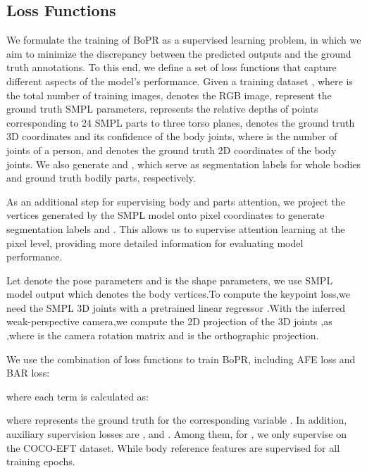 \documentclass[10pt,twocolumn,letterpaper]{article}
\begin{document}
\subsection{Loss Functions}
We formulate the training of BoPR as a supervised learning problem, in which we aim to minimize the discrepancy between the predicted outputs and the ground truth annotations. To this end, we define a set of loss functions that capture different aspects of the model's performance. Given a training dataset , where  is the total number of training images,  denotes the RGB image,  represent the ground truth SMPL parameters,  represents the relative depths of points corresponding to 24 SMPL parts to three torso planes,  denotes the ground truth 3D coordinates and its confidence of the body joints, where  is the number of joints of a person, and  denotes the ground truth 2D coordinates of the body joints. We also generate  and , which serve as segmentation labels for whole bodies and ground truth bodily parts, respectively.

As an additional step for supervising body and parts attention, we project the vertices generated by the SMPL model onto pixel coordinates to generate segmentation labels  and . This allows us to supervise attention learning at the pixel level, providing more detailed information for evaluating model performance.

Let  denote the pose parameters and  is the shape parameters, we use SMPL model output  which denotes the body vertices.To compute the keypoint loss,we need the SMPL 3D joints  with a pretrained linear regressor .With the inferred weak-perspective camera,we compute the 2D projection of the 3D joints ,as ,where  is the camera rotation matrix and  is the orthographic projection.

We use the combination of loss functions to train BoPR, including AFE loss and BAR loss:

where each term is calculated as:

where  represents the ground truth for the corresponding variable . In addition, auxiliary supervision losses are ,  and . Among them, for , we only supervise on the COCO-EFT dataset. While body reference features are supervised for all training epochs.
\end{document}
